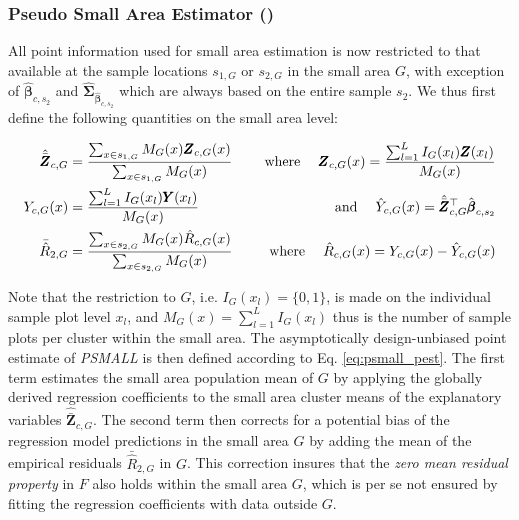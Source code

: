 \subsubsection{Pseudo Small Area Estimator (\psmall{})}
\label{sec:psmall}

All point information used for small area estimation is now restricted to that available at the sample locations $s_{1,G}$ or $s_{2,G}$ in the small area $G$, with exception of $\hat{\pmb{\beta}}_{c,s_2}$ and $\hat{\pmb{\Sigma}}_{\hat{\pmb{\beta}}_{c,s_2}}$ which are always based on the entire sample $s_2$. We thus first define the following quantities on the small area level:

\begin{subequations}\label{eq:compsG}
	\begin{align}
	\hat{\bar{\pmb{Z}}}_{c,G} &= \frac{\sum_{x \in s_{1,G}} M_{G}(x) \pmb{Z}_{c,G}(x)}{\sum_{x \in s_{1,G}} M_{G}(x)} \label{eq:meanZcG} \hspace{3ex} &\text{where} \hspace{3ex}
	\pmb{Z}_{c,G}(x) =  \frac{\sum_{l=1}^{L} I_{G}(x_l)\pmb{Z}(x_l)}{M_{G}(x)}\\		
	Y_{c,G}(x) &= \frac{\sum_{l=1}^{L} I_{G}(x_l)\pmb{Y}(x_l)}{M_{G}(x)}  &\text{and} \hspace{3ex}
	\hat{Y}_{c,G}(x)=\hat{\bar{\pmb{Z}}}_{c,G}^{\top}\hat{\pmb{\beta}}_{c,s_2}\\
	\bar{\hat{R}}_{2,G} &= \frac{\sum_{x \in s_{2,G}} M_{G}(x) \hat{R}_{c,G}(x)}{\sum_{x \in s_{2,G}} M_{G}(x)} \hspace{3ex} &\text{where} \hspace{3ex}
	\hat{R}_{c,G}(x) = Y_{c,G}(x)-\hat{Y}_{c,G}(x)
	\end{align}
\end{subequations}

Note that the restriction to $G$, i.e. $I_{G}(x_l)=\{0,1\}$, is made on the individual sample plot level $x_l$, and $M_{G}(x) = \sum_{l=1}^{L}I_{G}(x_l)$ thus is the number of sample plots per cluster within the small area. The asymptotically design-unbiased point estimate of \textit{PSMALL} is then defined according to Eq. \ref{eq:psmall_pest}. The first term estimates the small area population mean of $G$ by applying the globally derived regression coefficients to the small area cluster means of the explanatory variables $\hat{\bar{\pmb{Z}}}_{c,G}$. The second term then corrects for a potential bias of the regression model predictions in the small area $G$ by adding the mean of the empirical residuals $\bar{\hat{R}}_{2,G}$ in $G$. This correction insures that the \textit{zero mean residual property} in $F$ also holds within the small area $G$, which is per se not ensured by fitting the regression coefficients with data outside $G$.

